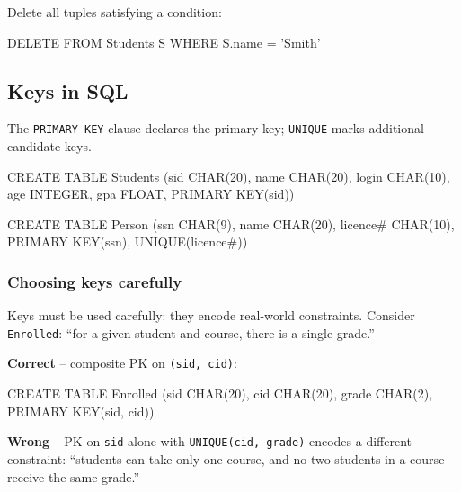 \documentclass[../../dis.tex]{subfiles}
\begin{document}
Delete all tuples satisfying a condition:
\begin{sql}
    DELETE FROM Students S WHERE S.name = 'Smith'
\end{sql}

\subsection{Keys in SQL}
The \lstinline[style=SQLStyle]{PRIMARY KEY} clause declares the primary key; \lstinline[style=SQLStyle]{UNIQUE} marks additional candidate keys.

\begin{minipage}[t]{0.48\textwidth}
\begin{sql}
    CREATE TABLE Students
      (sid   CHAR(20),
       name  CHAR(20),
       login CHAR(10),
       age   INTEGER,
       gpa   FLOAT,
       PRIMARY KEY(sid))
\end{sql}
\end{minipage}
\hfill
\begin{minipage}[t]{0.48\textwidth}
\begin{sql}
    CREATE TABLE Person
      (ssn      CHAR(9),
       name     CHAR(20),
       licence# CHAR(10),
       PRIMARY KEY(ssn),
       UNIQUE(licence#))
\end{sql}
\end{minipage}

\subsubsection*{Choosing keys carefully}
Keys must be used carefully: they encode real-world constraints. Consider \texttt{Enrolled}: ``for a given student and course, there is a single grade.''

\begin{minipage}[t]{0.48\textwidth}
\textbf{Correct} -- composite PK on \texttt{(sid, cid)}:
\begin{sql}
    CREATE TABLE Enrolled
      (sid   CHAR(20),
       cid   CHAR(20),
       grade CHAR(2),
       PRIMARY KEY(sid, cid))
\end{sql}
\end{minipage}
\hfill
\begin{minipage}[t]{0.48\textwidth}
\textbf{Wrong} -- PK on \texttt{sid} alone with \texttt{UNIQUE(cid, grade)} encodes a different constraint: ``students can take only one course, and no two students in a course receive the same grade.''
\end{minipage}
\end{document}
